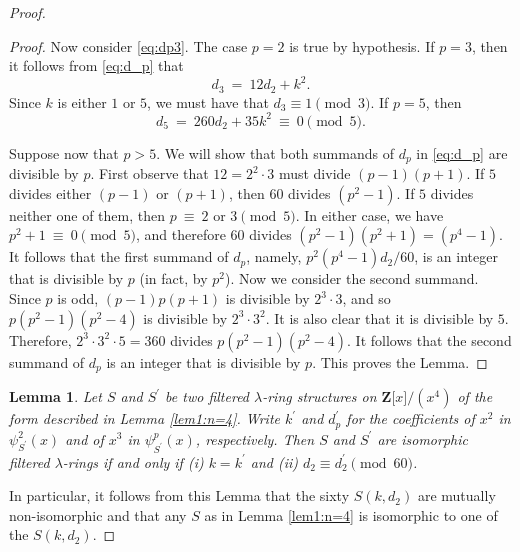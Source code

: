 \documentclass[reqno,11pt]{amsart}
\numberwithin{equation}{subsection}  %
\newtheorem{lemma}[subsection]{Lemma}
\newcommand{\bZ}{\mathbf{Z}}
\begin{document}
\begin{proof}
\begin{proof}
Now consider \eqref{eq:dp3}.  The case $p = 2$ is true by hypothesis.  If $p = 3$, then it follows from \eqref{eq:d_p} that
   \begin{equation}
   \label{eq:d3}
   d_3 ~=~ 12d_2 + k^2.
   \end{equation}
Since $k$ is either $1$ or $5$, we must have that $d_3 \equiv 1 \pmod 3$.  If $p = 5$, then 
   \[
   d_5 ~=~ 260d_2 + 35k^2 ~\equiv~ 0 \pmod 5.
   \]


Suppose now that $p > 5$.  We will show that both summands of $d_p$ in \eqref{eq:d_p} are divisible by $p$.  First observe that $12 = 2^2\cdot 3$ must divide $(p - 1)(p + 1)$.  If $5$ divides either $(p - 1)$ or $(p + 1)$, then $60$ divides $(p^2 - 1)$.  If $5$ divides neither one of them, then $p ~\equiv~ 2 \text{ or } 3 \pmod 5$.  In either case, we have 
$p^2 + 1 ~\equiv~ 0 \pmod 5$, and therefore $60$ divides $(p^2 - 1)(p^2 + 1) = (p^4 - 1)$.  It follows that the first summand of $d_p$, namely, $p^2(p^4 - 1)d_2/60$, is an integer that is divisible by $p$ (in fact, by $p^2$).  Now we consider the second summand.  Since $p$ is odd, $(p - 1)p(p + 1)$ is divisible by $2^3\cdot 3$, and so $p(p^2 - 1)(p^2 - 4)$ is divisible by $2^3 \cdot 3^2$.  It is also clear that it is divisible by $5$.  Therefore, $2^3\cdot 3^2 \cdot 5 = 360$ divides $p(p^2 - 1)(p^2 - 4)$.  It follows that the second summand of $d_p$ is an integer that is divisible by $p$.  This proves the Lemma.
\end{proof}



\medskip
\begin{lemma}
\label{lem2:n=4}
Let $S$ and $S^\prime$ be two filtered $\lambda$-ring structures on $\bZ \lbrack x \rbrack/(x^4)$ of the form described in Lemma \ref{lem1:n=4}.  Write $k^\prime$ and $d_p^\prime$ for the coefficients of $x^2$ in $\psi^2_{S^\prime}(x)$ and of $x^3$ in $\psi^p_{S^\prime}(x)$, respectively.  Then $S$ and $S^\prime$ are isomorphic filtered $\lambda$-rings if and only if (i) $k = k^\prime$ and (ii) $d_2 \equiv d_2^\prime \pmod{60}$.
\end{lemma}


In particular, it follows from this Lemma that the sixty $S(k, d_2)$ are mutually non-isomorphic and that any $S$ as in Lemma \ref{lem1:n=4} is isomorphic to one of the $S(k, d_2)$.



\end{proof}
\end{document}

